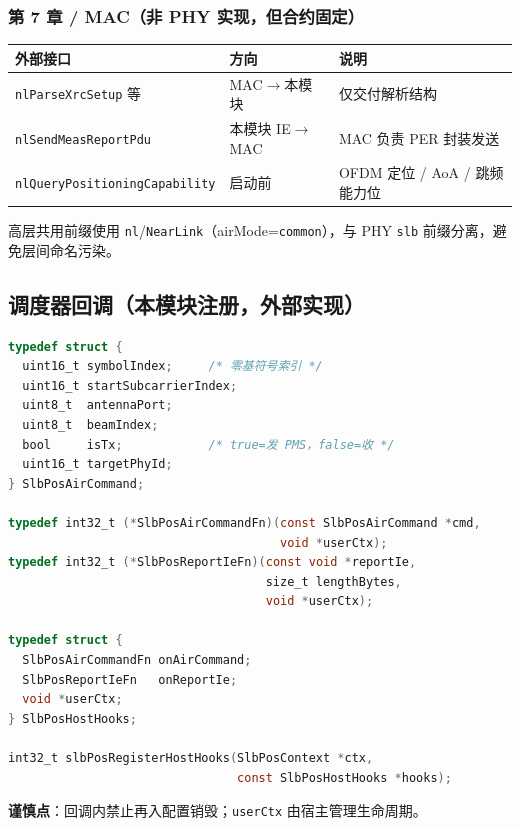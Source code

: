 \documentclass[11pt,a4paper]{ctexart}
\begin{document}
\subsubsection{第 7 章 / MAC（非 PHY 实现，但合约固定）}

\begin{table}[h]
\centering
\small
\begin{tabular}{L{4.6cm}L{4.0cm}L{4.6cm}}
\toprule
\textbf{外部接口} & \textbf{方向} & \textbf{说明} \\
\midrule
\texttt{nlParseXrcSetup} 等 & MAC$\rightarrow$本模块 & 仅交付解析结构 \\
\texttt{nlSendMeasReportPdu} & 本模块 IE$\rightarrow$MAC & MAC 负责 PER 封装发送 \\
\texttt{nlQueryPositioningCapability} & 启动前 & OFDM 定位 / AoA / 跳频能力位 \\
\bottomrule
\end{tabular}
\end{table}

\noindent 高层共用前缀使用 \texttt{nl}/\texttt{NearLink}（airMode=\texttt{common}），与 PHY \texttt{slb} 前缀分离，避免层间命名污染。

\subsection{调度器回调（本模块注册，外部实现）}

\begin{lstlisting}[language=C,caption={空口命令回调（外部实现，本模块调用）}]
typedef struct {
  uint16_t symbolIndex;     /* 零基符号索引 */
  uint16_t startSubcarrierIndex;
  uint8_t  antennaPort;
  uint8_t  beamIndex;
  bool     isTx;            /* true=发 PMS，false=收 */
  uint16_t targetPhyId;
} SlbPosAirCommand;

typedef int32_t (*SlbPosAirCommandFn)(const SlbPosAirCommand *cmd,
                                      void *userCtx);
typedef int32_t (*SlbPosReportIeFn)(const void *reportIe,
                                    size_t lengthBytes,
                                    void *userCtx);

typedef struct {
  SlbPosAirCommandFn onAirCommand;
  SlbPosReportIeFn   onReportIe;
  void *userCtx;
} SlbPosHostHooks;

int32_t slbPosRegisterHostHooks(SlbPosContext *ctx,
                                const SlbPosHostHooks *hooks);
\end{lstlisting}

\textbf{谨慎点}：回调内禁止再入配置销毁；\texttt{userCtx} 由宿主管理生命周期。
\end{document}
